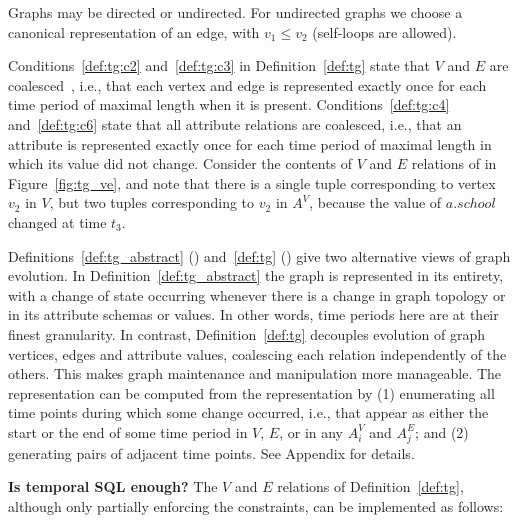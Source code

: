 Graphs may be directed or undirected.  For undirected graphs we choose
a canonical representation of an edge, with $v_1 \leq v_2$ (self-loops
are allowed).

Conditions~\ref{def:tg:c2} and~\ref{def:tg:c3} in
Definition~\ref{def:tg} state that $V$ and $E$ are
coalesced~\cite{DBLP:conf/vldb/BohlenSS96}, i.e., that each vertex and
edge is represented exactly once for each time period of maximal
length when it is present.  Conditions~\ref{def:tg:c4}
and~\ref{def:tg:c6} state that all attribute relations are coalesced,
i.e., that an attribute is represented exactly once for each time
period of maximal length in which its value did not change.  Consider
the contents of $V$ and $E$ relations of  in
Figure~\ref{fig:tg_ve}, and note that there is a single tuple
corresponding to vertex $v_2$ in $V$, but two tuples corresponding to
$v_2$ in $A^{V}$, because the value of $a.school$ changed at time
$t_3$.

Definitions~\ref{def:tg_abstract} (\rgs) and~\ref{def:tg} (\ve) give
two alternative views of graph evolution.  In
Definition~\ref{def:tg_abstract} the graph is represented in its
entirety, with a change of state occurring whenever there is a change
in graph topology or in its attribute schemas or values.  In other
words, time periods here are at their finest granularity.  In
contrast, Definition~\ref{def:tg} decouples evolution of graph
vertices, edges and attribute values, coalescing each relation
independently of the others.  This makes graph maintenance and
manipulation more manageable.  The \rgs representation can be computed
from the \ve representation by (1) enumerating all time points during
which some change occurred, i.e., that appear as either the start or
the end of some time period in $V$, $E$, or in any $A^{V}_i$ and
$A^{E}_j$; and (2) generating pairs of adjacent time points. See
Appendix for details.

{\bf Is temporal SQL enough?} The $V$ and $E$ relations of
Definition~\ref{def:tg}, although only partially enforcing the
constraints, can be implemented as follows:


